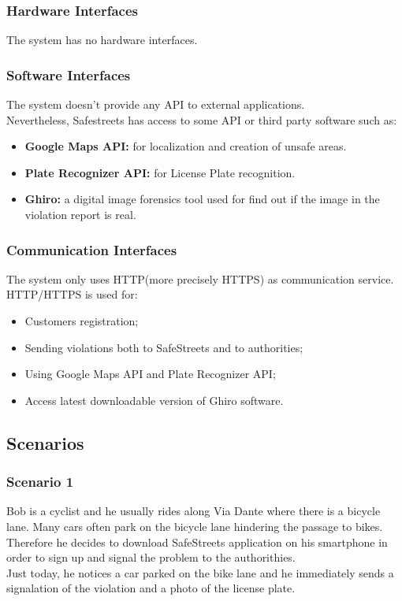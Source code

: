 \documentclass{article}
\begin{document}
\subsubsection{Hardware Interfaces}
The system has no hardware interfaces.
\subsubsection{Software Interfaces}
The system doesn't provide any API to external applications.\\
Nevertheless, Safestreets has access to some API or third party software such as:
\begin{itemize}
    \item \textbf{Google Maps API:} for localization and creation of unsafe areas.
    \item \textbf{Plate Recognizer API:} for License Plate recognition.
    \item \textbf{Ghiro:} a digital image forensics tool used for find out if the image
    in the violation report is real.
\end{itemize}
\subsubsection{Communication Interfaces}
The system only uses HTTP(more precisely HTTPS) as communication service.
HTTP/HTTPS is used for:
\begin{itemize}
    \item Customers registration;
    \item Sending violations both to SafeStreets and to authorities;
    \item Using Google Maps API and Plate Recognizer API;
    \item Access latest downloadable version of Ghiro software.
\end{itemize}
\subsection{Scenarios}
\subsubsection{Scenario 1}
Bob is a cyclist and he usually rides along Via Dante where there is a bicycle
lane. Many cars often park on the bicycle lane hindering the passage to bikes.
Therefore he decides to download SafeStreets application on his smartphone in
order to sign up and signal the problem to the authorithies.\\ Just today, he
notices a car parked on the bike lane and he immediately sends a signalation of
the violation and a photo of the license plate.
\end{document}
